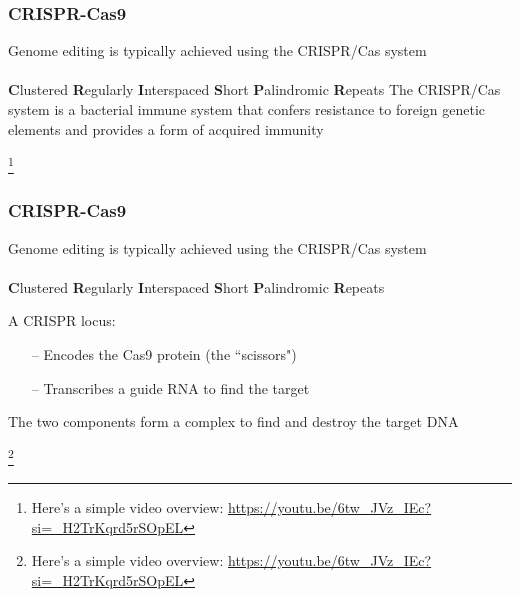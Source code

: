 \documentclass[xcolor=dvipsnames]{beamer}
\newcommand\blfootnote[1]{%
	\begingroup
	\renewcommand\thefootnote{}\footnote{#1}%
	\addtocounter{footnote}{-1}%
	\endgroup
}
\begin{document}
\begin{frame}
	\frametitle{CRISPR-Cas9}
	
	Genome editing is typically achieved using the CRISPR/Cas system\\
	\\
	
	\textbf{C}lustered \textbf{R}egularly \textbf{I}nterspaced \textbf{S}hort \textbf{P}alindromic \textbf{R}epeats
	\flushleft
	The CRISPR/Cas system is a bacterial immune system that confers resistance to foreign genetic elements and provides a form of acquired immunity
	
	
	\blfootnote{Here's a simple video overview: \url{https://youtu.be/6tw_JVz_IEc?si=_H2TrKqrd5rSOpEL}}
\end{frame}



\begin{frame}
	\frametitle{CRISPR-Cas9}
	
	Genome editing is typically achieved using the CRISPR/Cas system\\
	\\
	
	\textbf{C}lustered \textbf{R}egularly \textbf{I}nterspaced \textbf{S}hort \textbf{P}alindromic \textbf{R}epeats
	\flushleft

	A CRISPR locus: \\
	
	\begin{itemize}
		\item[--] Encodes the Cas9 protein (the ``scissors")
		\item[--] Transcribes a guide RNA to find the target
	\end{itemize} 
			
The two components form a complex to find and destroy the target DNA
	
	
	\blfootnote{Here's a simple video overview: \url{https://youtu.be/6tw_JVz_IEc?si=_H2TrKqrd5rSOpEL}}
\end{frame}
\end{document}
